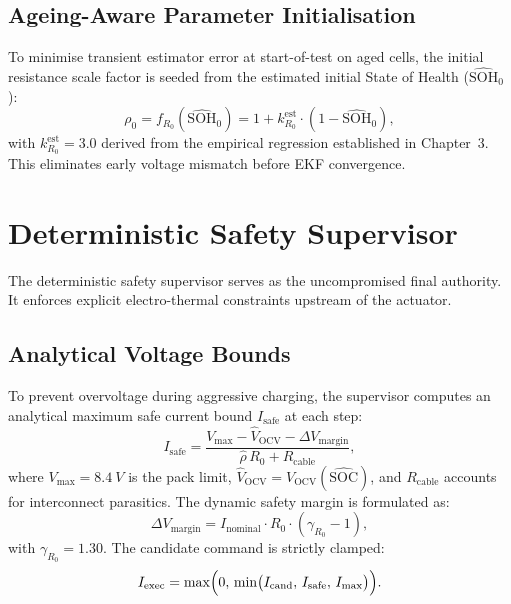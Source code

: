 \subsection{Ageing-Aware Parameter Initialisation}
\label{subsec:ch5_ageing_init}

To minimise transient estimator error at start-of-test on aged cells, the initial resistance scale factor is seeded from the estimated initial State of Health ($\widehat{\mathrm{SOH}}_0$):
\begin{equation}
  \rho_0 = f_{R_0}(\widehat{\mathrm{SOH}}_0) = 1 + k_{R_0}^{\mathrm{est}} \cdot \left(1 - \widehat{\mathrm{SOH}}_0\right),
\end{equation}
with $k_{R_0}^{\mathrm{est}} = 3.0$ derived from the empirical regression established in Chapter~3. This eliminates early voltage mismatch before EKF convergence.

\section{Deterministic Safety Supervisor}
\label{sec:ch5_safety}

The deterministic safety supervisor serves as the uncompromised final authority. It enforces explicit electro-thermal constraints upstream of the actuator.

\subsection{Analytical Voltage Bounds}
\label{subsec:ch5_voltage_bounds}

To prevent overvoltage during aggressive charging, the supervisor computes an analytical maximum safe current bound $I_{\mathrm{safe}}$ at each step:
\begin{equation}
  I_{\mathrm{safe}} = \frac{V_{\mathrm{max}} - \hat{V}_{\mathrm{OCV}} - \Delta V_{\mathrm{margin}}}{\hat{\rho} \, R_0 + R_{\mathrm{cable}}},
  \label{eq:i_safe}
\end{equation}
where $V_{\mathrm{max}} = \SI{8.4}{V}$ is the pack limit, $\hat{V}_{\mathrm{OCV}} = V_{\mathrm{OCV}}(\widehat{\mathrm{SOC}})$, and $R_{\mathrm{cable}}$ accounts for interconnect parasitics. The dynamic safety margin is formulated as:
\begin{equation}
  \Delta V_{\mathrm{margin}} = I_{\mathrm{nominal}} \cdot R_0 \cdot (\gamma_{R_0} - 1),
\end{equation}
with $\gamma_{R_0} = 1.30$. The candidate command is strictly clamped:
\begin{equation}
  I_{\mathrm{exec}} = \max\Bigl(0,\, \min\bigl(I_{\mathrm{cand}},\, I_{\mathrm{safe}},\, I_{\mathrm{max}}\bigr)\Bigr).
\end{equation}

